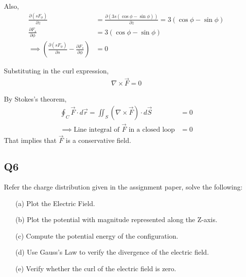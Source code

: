 \documentclass[12pt]{article}
\providecommand{\brak}[1]{\ensuremath{\left(#1\right)}}
\begin{document}
Also,
\begin{align*}
    \frac{\partial \brak{s F_{\phi}}}{\partial z} &= \frac{\partial \brak{3s\brak{\cos{\phi} - \sin{\phi}}}}{\partial z} = 3\brak{\cos{\phi} - \sin{\phi}}\\
    \frac{\partial F_s}{\partial \phi} &= 3\brak{\cos{\phi} - \sin{\phi}}\\
    \implies \brak{ \frac{\partial (s F_\phi)}{\partial s} - \frac{\partial F_s}{\partial \phi} } &= 0
\end{align*}

Substituting in the curl expression,
\begin{align*}
    \nabla \times \vec{F} = 0
\end{align*}

By Stokes's theorem,
\begin{align*}
    \oint_C \vec{F} \cdot d\vec{r} = \iint_S (\nabla \times \vec{F}) \cdot d\vec{S} &= 0\\
    \implies \text{Line integral of } \vec{F} \text{ in a closed loop} &= 0
\end{align*}
That implies that $\vec{F}$ is a conservative field.

\subsection*{Q6}
Refer the charge distribution given in the assignment paper, solve the following:

\begin{enumerate}
    \item[(a)] Plot the Electric Field.
    \item[(b)] Plot the potential with magnitude represented along the Z-axis.
    \item[(c)] Compute the potential energy of the configuration.
    \item[(d)] Use Gauss's Law to verify the divergence of the electric field.
    \item[(e)] Verify whether the curl of the electric field is zero.
\end{enumerate}
\end{document}
